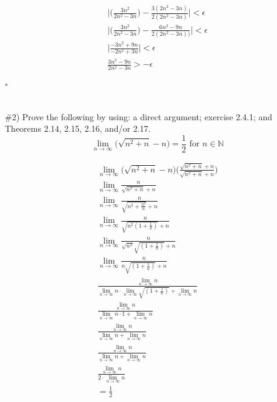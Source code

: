 \documentclass[11pt]{article}
\begin{document}
\begin{equation}
	\begin{aligned}
		\bigg|\bigg(\frac{3n^2}{2n^2-3n}\bigg) - \frac{3(2n^2-3n)}{2(2n^2-3n)}\bigg| < \epsilon \\
		\bigg|\bigg(\frac{3n^2}{2n^2-3n}\bigg) - \frac{6n^2-9n}{2(2n^2-3n))}\bigg| < \epsilon \\
		\bigg|\frac{-3n^2+9n}{-2n^2+3n}\bigg| < \epsilon \\
		\frac{3n^2-9n}{2n^2-3n} > -\epsilon \\
	\end{aligned}
\end{equation}

$\square$

\section{}

\#2) Prove the following by using: a direct argument; exercise 2.4.1; and Theorems 2.14, 2.15, 2.16, and/or 2.17.
\begin{equation}
	\lim_{n \rightarrow \infty} \big(\sqrt{n^2+n}-n\big)=\frac{1}{2}\text{ for }n \in \mathbb{N}
\end{equation}

\begin{equation}
	\begin{aligned}
		\lim_{n \rightarrow \infty} \big(\sqrt{n^2+n}-n\big) \bigg(\frac{\sqrt{n^2+n}+n}{\sqrt{n^2+n}+n} \bigg) \\
		\lim_{n \rightarrow \infty} \frac{n}{\sqrt{n^2+n}+n} \\
		\lim_{n \rightarrow \infty} \frac{n}{\sqrt{n^2+\frac{n^2}{n}}+n} \\
		\lim_{n \rightarrow \infty} \frac{n}{\sqrt{n^2(1+\frac{1}{n})}+n} \\
		\lim_{n \rightarrow \infty} \frac{n}{\sqrt{n^2}\sqrt{(1+\frac{1}{n})}+n} \\
		\lim_{n \rightarrow \infty} \frac{n}{n\sqrt{(1+\frac{1}{n})}+n} \\
		\frac{\displaystyle\lim_{n \rightarrow \infty}n}{\displaystyle\lim_{n \rightarrow \infty}n\cdot\displaystyle\lim_{n \rightarrow \infty}\sqrt{(1+\frac{1}{n})}+\displaystyle\lim_{n \rightarrow \infty}n} \\
		\frac{\displaystyle\lim_{n \rightarrow \infty}n}{\displaystyle\lim_{n \rightarrow \infty}n\cdot1+\displaystyle\lim_{n \rightarrow \infty}n} \\
		\frac{\displaystyle\lim_{n \rightarrow \infty}n}{\displaystyle\lim_{n \rightarrow \infty}n+\displaystyle\lim_{n \rightarrow \infty}n} \\
		\frac{\displaystyle\lim_{n \rightarrow \infty}n}{\displaystyle\lim_{n \rightarrow \infty}n+\displaystyle\lim_{n \rightarrow \infty}n} \\
		\frac{\displaystyle\lim_{n \rightarrow \infty}n}{2\cdot\displaystyle\lim_{n \rightarrow \infty}n} \\
		=\frac{1}{2}
	\end{aligned}
\end{equation}
\end{document}
